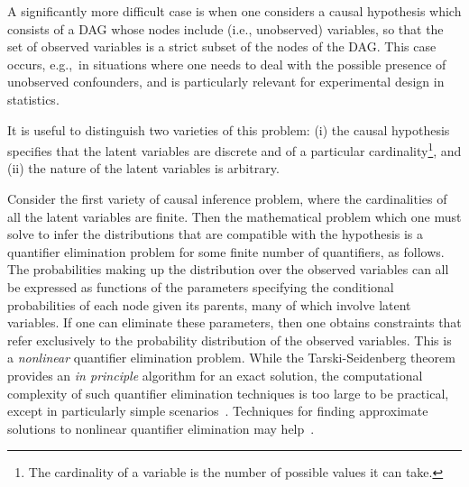 A significantly more difficult case is when one considers a causal hypothesis which consists of a DAG whose nodes include  (i.e., unobserved) variables, so that the set of observed variables is a strict subset of the nodes of the DAG. This case occurs, e.g.,~in situations where one needs to deal with the possible presence of unobserved confounders, and is particularly relevant for experimental design in statistics. 

It is useful to distinguish two varieties of this problem: (i) the causal hypothesis specifies that the latent variables are discrete and of a particular cardinality\footnote{The cardinality of a variable is the number of possible values it can take.}, and (ii) the nature of the latent variables is arbitrary.  

Consider the first variety of causal inference problem, where the cardinalities of all the latent variables are finite. Then the mathematical problem which one must solve to infer the distributions that are compatible with the hypothesis is a quantifier elimination problem for some finite number of quantifiers, as follows. The probabilities making up the distribution over the observed variables can all be expressed as functions of the parameters specifying the conditional probabilities of each node given its parents, many of which involve latent variables. If one can eliminate these 
parameters, then one obtains constraints that refer exclusively to the probability distribution of the observed variables.  This is a {\em nonlinear} quantifier elimination problem. While the Tarski-Seidenberg theorem provides an \emph{in principle} algorithm for an exact solution, the computational complexity of such quantifier elimination techniques is too large to be practical, except in particularly simple scenarios~\cite{LeeSpekkens}. Techniques for finding approximate solutions to nonlinear quantifier elimination may help~\cite{ChavesPolynomial}.

